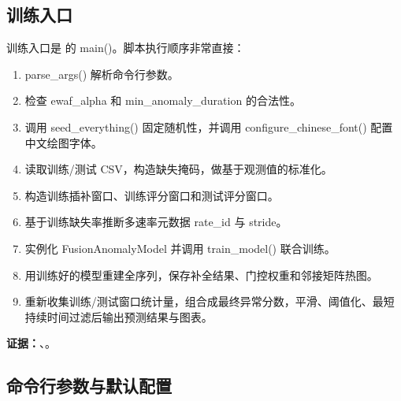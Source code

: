 \documentclass[11pt,a4paper]{ctexart}
\newcommand{\code}[1]{{\ttfamily\small #1}}
\newcommand{\evidence}[1]{\textbf{证据：}#1}
\begin{document}
\subsection{训练入口}

训练入口是  的 \code{main()}。脚本执行顺序非常直接：
\begin{enumerate}
  \item \code{parse\_args()} 解析命令行参数。
  \item 检查 \code{ewaf\_alpha} 和 \code{min\_anomaly\_duration} 的合法性。
  \item 调用 \code{seed\_everything()} 固定随机性，并调用 \code{configure\_chinese\_font()} 配置中文绘图字体。
  \item 读取训练/测试 CSV，构造缺失掩码，做基于观测值的标准化。
  \item 构造训练插补窗口、训练评分窗口和测试评分窗口。
  \item 基于训练缺失率推断多速率元数据 \code{rate\_id} 与 \code{stride}。
  \item 实例化 \code{FusionAnomalyModel} 并调用 \code{train\_model()} 联合训练。
  \item 用训练好的模型重建全序列，保存补全结果、门控权重和邻接矩阵热图。
  \item 重新收集训练/测试窗口统计量，组合成最终异常分数，平滑、阈值化、最短持续时间过滤后输出预测结果与图表。
\end{enumerate}

\evidence{、。}

\subsection{命令行参数与默认配置}
\end{document}
